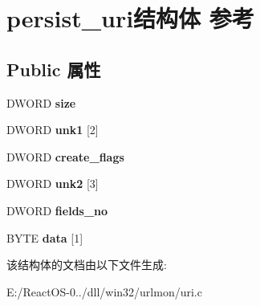 \hypertarget{structpersist__uri}{}\section{persist\+\_\+uri结构体 参考}
\label{structpersist__uri}
\subsection*{Public 属性}
\begin{DoxyCompactItemize}
\item 
\mbox{\label{structpersist__uri_a0a47ddb4a30d01ca1e36d5c6dee5ca2c}} 
D\+W\+O\+RD {\bfseries size}
\item 
\mbox{\label{structpersist__uri_a2db6ab3c619d9ac08ba70661290c6b4c}} 
D\+W\+O\+RD {\bfseries unk1} \mbox{[}2\mbox{]}
\item 
\mbox{\label{structpersist__uri_a3396ff68f7d94be2e8cc571e6195fc21}} 
D\+W\+O\+RD {\bfseries create\+\_\+flags}
\item 
\mbox{\label{structpersist__uri_a83faac0c201ff3774d645944e97c9201}} 
D\+W\+O\+RD {\bfseries unk2} \mbox{[}3\mbox{]}
\item 
\mbox{\label{structpersist__uri_abe7755d03f3c8ce45f368eddd826dc27}} 
D\+W\+O\+RD {\bfseries fields\+\_\+no}
\item 
\mbox{\label{structpersist__uri_a98f03ae40a43b8255755dc64e0254efc}} 
B\+Y\+TE {\bfseries data} \mbox{[}1\mbox{]}
\end{DoxyCompactItemize}


该结构体的文档由以下文件生成\+:\begin{DoxyCompactItemize}
\item 
E\+:/\+React\+O\+S-\/0../dll/win32/urlmon/uri.\+c\end{DoxyCompactItemize}
